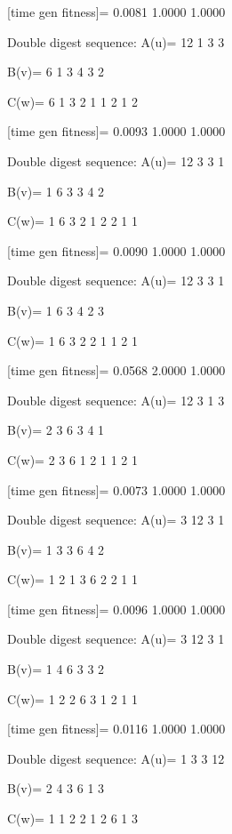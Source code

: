 [time gen fitness]=
    0.0081    1.0000    1.0000

Double digest sequence:
A(u)=
    12     1     3     3

B(v)=
     6     1     3     4     3     2

C(w)=
     6     1     3     2     1     1     2     1     2

[time gen fitness]=
    0.0093    1.0000    1.0000

Double digest sequence:
A(u)=
    12     3     3     1

B(v)=
     1     6     3     3     4     2

C(w)=
     1     6     3     2     1     2     2     1     1

[time gen fitness]=
    0.0090    1.0000    1.0000

Double digest sequence:
A(u)=
    12     3     3     1

B(v)=
     1     6     3     4     2     3

C(w)=
     1     6     3     2     2     1     1     2     1

[time gen fitness]=
    0.0568    2.0000    1.0000

Double digest sequence:
A(u)=
    12     3     1     3

B(v)=
     2     3     6     3     4     1

C(w)=
     2     3     6     1     2     1     1     2     1

[time gen fitness]=
    0.0073    1.0000    1.0000

Double digest sequence:
A(u)=
     3    12     3     1

B(v)=
     1     3     3     6     4     2

C(w)=
     1     2     1     3     6     2     2     1     1

[time gen fitness]=
    0.0096    1.0000    1.0000

Double digest sequence:
A(u)=
     3    12     3     1

B(v)=
     1     4     6     3     3     2

C(w)=
     1     2     2     6     3     1     2     1     1

[time gen fitness]=
    0.0116    1.0000    1.0000

Double digest sequence:
A(u)=
     1     3     3    12

B(v)=
     2     4     3     6     1     3

C(w)=
     1     1     2     2     1     2     6     1     3

